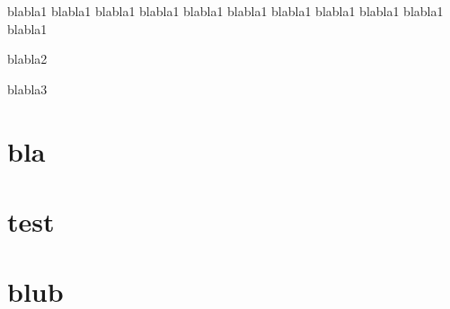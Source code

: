 \documentclass{beamer}
\newcommand{\injecttext}[1]{%
    \vskip-2\baselineskip
    \setlength{\leftskip}{1.2em}
    #1\par
    \setlength{\leftskip}{0em}
}
\begin{document}
\begin{frame}
\tableofcontents
\end{frame}


\begin{frame} 
\tableofcontents[sections=1] 
\injecttext{blabla1 blabla1 blabla1 blabla1 blabla1 blabla1 blabla1 blabla1 blabla1 blabla1 blabla1} 
\tableofcontents[sections=2] 
\injecttext{blabla2} 
\tableofcontents[sections=3] 
\injecttext{blabla3} 
\end{frame}

\section{bla}\frame{}
\section{test}\frame{}
\section{blub}\frame{}
\end{document}
